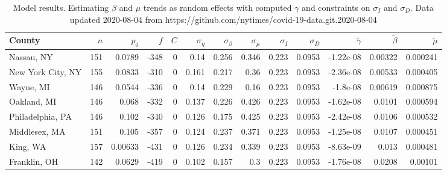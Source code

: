 \documentclass[12pt,letterpaper]{article}
\begin{document}
\begin{sidewaystable}
\caption{\label{tab:cons}
Model results. Estimating $\beta$ and $\mu$ trends as random effects with computed $\gamma$
and constraints on  $\sigma_I$ and $\sigma_D$. 
Data updated 2020-08-04 from https://github.com/nytimes/covid-19-data.git.2020-08-04
}
\centering
{\footnotesize


\begin{tabular}{lrrrrrrrrrrrr}
\hline
 County             &   $n$ &   $p_0$ &    $f$ &   $C$ &   $\sigma_\eta$ &   $\sigma_\beta$ &   $\sigma_\mu$ &   $\sigma_I$ &   $\sigma_D$ &   $\tilde\gamma$ &   $\tilde{\beta}$ &   $\tilde{\mu}$ \\
\hline
 Nassau, NY         & 151   & 0.0789  & -348   &     0 &          0.14   &            0.256 &         0.346  &        0.223 &       0.0953 &        -1.22e-08 &           0.00322 &        0.000241 \\
 New York City, NY  & 155   & 0.0833  & -310   &     0 &          0.161  &            0.217 &         0.36   &        0.223 &       0.0953 &        -2.36e-08 &           0.00533 &        0.000405 \\
 Wayne, MI          & 146   & 0.0544  & -336   &     0 &          0.14   &            0.229 &         0.16   &        0.223 &       0.0953 &        -1.8e-08  &           0.00619 &        0.000875 \\
 Oakland, MI        & 146   & 0.068   & -332   &     0 &          0.137  &            0.226 &         0.426  &        0.223 &       0.0953 &        -1.62e-08 &           0.0101  &        0.000594 \\
 Philadelphia, PA   & 146   & 0.102   & -340   &     0 &          0.126  &            0.175 &         0.425  &        0.223 &       0.0953 &        -2.42e-08 &           0.0106  &        0.000532 \\
 Middlesex, MA      & 151   & 0.105   & -357   &     0 &          0.124  &            0.237 &         0.371  &        0.223 &       0.0953 &        -1.25e-08 &           0.0107  &        0.000451 \\
 King, WA           & 157   & 0.00633 & -431   &     0 &          0.126  &            0.234 &         0.339  &        0.223 &       0.0953 &        -8.63e-09 &           0.013   &        0.000481 \\
 Franklin, OH       & 142   & 0.0629  & -419   &     0 &          0.102  &            0.157 &         0.3    &        0.223 &       0.0953 &        -1.76e-08 &           0.0208  &        0.00101  \\

\end{tabular}}
\end{sidewaystable}
\end{document}
